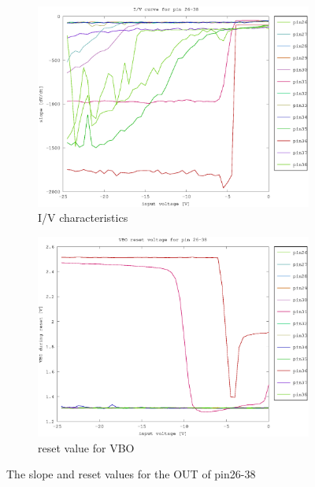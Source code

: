 \documentclass{article}
\begin{document}
\begin{figure}[h]
	\centering
	\begin{subfigure}[b]{0.475\textwidth}
	    \centering
	    \includegraphics[width=\textwidth]{fig/pin26-38_slope_-25-0V.eps}
	    \caption[Network2]%
	    {I/V characteristics}    
	    \label{fig:pin26-40_slope}
	\end{subfigure}
	\hfill
	\begin{subfigure}[b]{0.475\textwidth}  
	    \centering 
	    \includegraphics[width=\textwidth]{fig/pin26-38_reset_-25-0V.eps}
	    \caption[]%
	    {reset value for VBO}    
	    \label{fig:pin26-40_reset}
	\end{subfigure}
	\caption{The slope and reset values for the OUT of pin26-38}
	\label{fig:pin32}
\end{figure}
\end{document}

